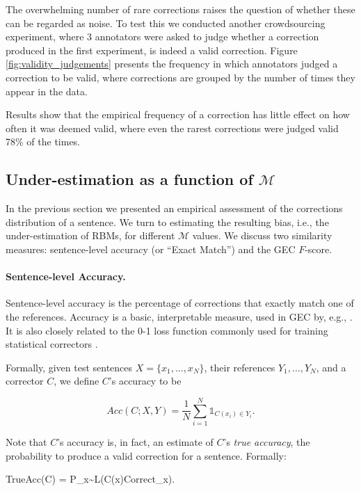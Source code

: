 \documentclass[letterpaper, 11pt]{article}
\newenvironment{myequation}{
  \vspace{-1em}
 \begin{equation}
}{
 \end{equation}
 \vspace{-1.2em}
}
\newenvironment{myequation*}{
	\vspace{-1em}
	\begin{equation*}
}{
\end{equation*}
\vspace{-1.2em}
}
\begin{document}
The overwhelming number of rare corrections raises the question of whether these can be regarded as noise.
To test this we conducted another crowdsourcing experiment, where 3 annotators were asked to judge whether a correction produced in the first experiment, is indeed a valid correction.
Figure \ref{fig:validity_judgements} presents the frequency in which annotators judged a correction to be valid, where corrections are grouped by the number of times they appear in the data.

Results show that the empirical frequency of a correction has little effect on how often it was deemed valid, where even the rarest corrections were judged valid 78\% of the times.

\subsection{Under-estimation as a function of $\mathcal{M}$} \label{subsec:Assessment-values}
In the previous section we presented an empirical assessment of the corrections distribution of a sentence. We turn to estimating the resulting bias, i.e., the under-estimation of RBMs, for different $\mathcal{M}$ values. 
We discuss two similarity measures: sentence-level accuracy
(or ``Exact Match'') and the GEC $F$-score.

\paragraph{Sentence-level Accuracy.}
Sentence-level accuracy is the percentage of corrections that
exactly match one of the references.
Accuracy is a basic, interpretable measure, used in GEC by, e.g., .
It is also closely related to the 0-1 loss function commonly used
for training statistical correctors \cite{chodorow2012problems,rozovskaya2013joint}. 

Formally, given test sentences $X=\{x_1,\ldots,x_N\}$,
their references $Y_1,\ldots,Y_N$, and a corrector $C$,
we define $C$'s accuracy to be

\begin{small}
\vspace{-0.2cm}
  \centering
  \begin{myequation}\label{eq:acc_def}
    Acc\left(C;X,Y\right) = \frac{1}{N} \sum_{i=1}^N \mathds{1}_{C(x_i) \in Y_i}.
  \end{myequation}
\end{small}

Note that $C$'s accuracy is, in fact, an estimate of $C$'s {\it true accuracy}, the probability to produce a valid correction for a sentence. Formally:
 \begin{small}
   \centering
   \vspace{-0.2cm}
   \begin{myequation*}
     TrueAcc\left(C\right) = P_{x\sim{L}}\left(C\left(x\right)\in Correct_x\right).
   \end{myequation*}
   \vspace{-0.15cm}
 \end{small}
%
\end{document}
